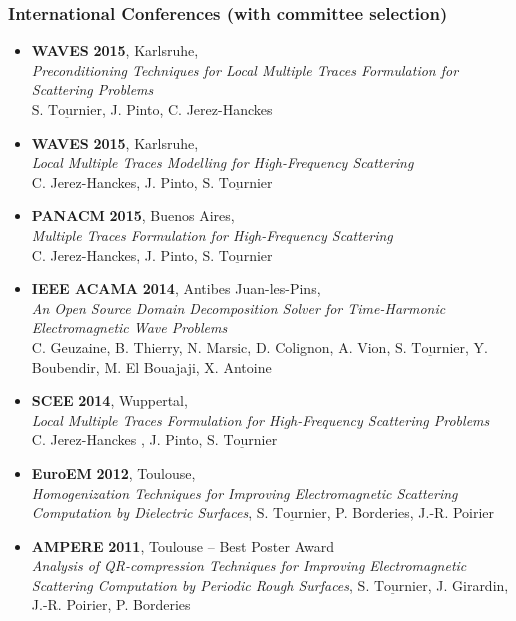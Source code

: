 \documentclass[a4paper,10pt,twoside]{article}
\newcommand\moi{$\underline{\textrm{S. Tournier}}$}
\begin{document}
\subsubsection*{International Conferences (with committee selection)}
\noindent
\begin{itemize}
\item[\textbullet]
  \textbf{WAVES} \textbf{2015}, Karlsruhe,\\
  \emph{Preconditioning Techniques
    for Local Multiple Traces Formulation for Scattering Problems}\\
  \moi,  J. Pinto, C. Jerez-Hanckes
\item[\textbullet]
  \textbf{WAVES} \textbf{2015}, Karlsruhe,\\
  \emph{Local Multiple Traces Modelling for High-Frequency Scattering}\\
  C. Jerez-Hanckes, J. Pinto, \moi
\item[\textbullet]
  \textbf{PANACM} \textbf{2015}, Buenos Aires,\\
  \emph{Multiple Traces Formulation for High-Frequency Scattering}\\
  C. Jerez-Hanckes, J. Pinto, \moi
\item[\textbullet]
\textbf{IEEE ACAMA} \textbf{2014}, Antibes Juan-les-Pins,\\
\emph{An Open Source Domain Decomposition Solver for
Time-Harmonic Electromagnetic Wave Problems}\\
C. Geuzaine, B. Thierry, N. Marsic, D. Colignon, A. Vion, \moi,
Y. Boubendir, M. El Bouajaji, X. Antoine
\item[\textbullet]
\textbf{SCEE} \textbf{2014}, Wuppertal,\\
\emph{Local Multiple Traces Formulation for High-Frequency Scattering Problems} \\
 C. Jerez-Hanckes , J. Pinto, \moi
\item[\textbullet]
\textbf{EuroEM} \textbf{2012}, Toulouse,\\
\emph{Homogenization  Techniques for Improving Electromagnetic
  Scattering Computation by Dielectric Surfaces},
\moi, P. Borderies, J.-R. Poirier
\item[\textbullet]
\textbf{AMPERE}
\textbf{2011}, Toulouse
-- \textsf{Best Poster Award}\\
\emph{Analysis of QR-compression
Techniques for Improving Electromagnetic Scattering Computation by
Periodic Rough Surfaces},
\moi, J. Girardin, J.-R. Poirier, P. Borderies


\end{itemize}
\end{document}
